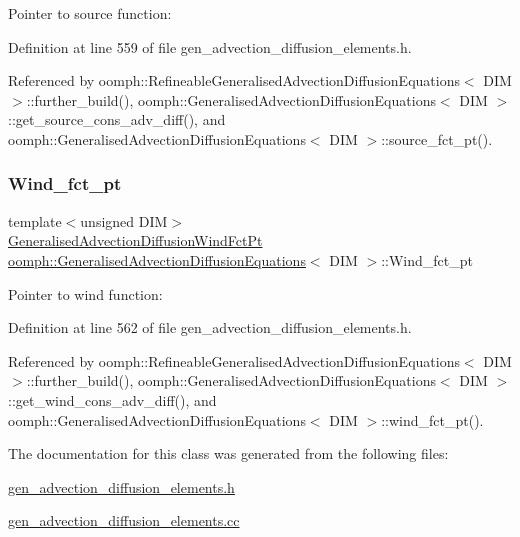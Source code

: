 Pointer to source function\+: 



Definition at line 559 of file gen\+\_\+advection\+\_\+diffusion\+\_\+elements.\+h.



Referenced by oomph\+::\+Refineable\+Generalised\+Advection\+Diffusion\+Equations$<$ D\+I\+M $>$\+::further\+\_\+build(), oomph\+::\+Generalised\+Advection\+Diffusion\+Equations$<$ D\+I\+M $>$\+::get\+\_\+source\+\_\+cons\+\_\+adv\+\_\+diff(), and oomph\+::\+Generalised\+Advection\+Diffusion\+Equations$<$ D\+I\+M $>$\+::source\+\_\+fct\+\_\+pt().

\mbox{\label{classoomph_1_1GeneralisedAdvectionDiffusionEquations_a50dd69aaff906d837a29171c6b1690c9}} 
\subsubsection{\texorpdfstring{Wind\+\_\+fct\+\_\+pt}{Wind\_fct\_pt}}
{\footnotesize\ttfamily template$<$unsigned D\+IM$>$ \\
\hyperlink{classoomph_1_1GeneralisedAdvectionDiffusionEquations_ac5a63eb03aee5957e7b14a4578423cfc}{Generalised\+Advection\+Diffusion\+Wind\+Fct\+Pt} \hyperlink{classoomph_1_1GeneralisedAdvectionDiffusionEquations}{oomph\+::\+Generalised\+Advection\+Diffusion\+Equations}$<$ D\+IM $>$\+::Wind\+\_\+fct\+\_\+pt\hspace{0.3cm}{\ttfamily [protected]}}



Pointer to wind function\+: 



Definition at line 562 of file gen\+\_\+advection\+\_\+diffusion\+\_\+elements.\+h.



Referenced by oomph\+::\+Refineable\+Generalised\+Advection\+Diffusion\+Equations$<$ D\+I\+M $>$\+::further\+\_\+build(), oomph\+::\+Generalised\+Advection\+Diffusion\+Equations$<$ D\+I\+M $>$\+::get\+\_\+wind\+\_\+cons\+\_\+adv\+\_\+diff(), and oomph\+::\+Generalised\+Advection\+Diffusion\+Equations$<$ D\+I\+M $>$\+::wind\+\_\+fct\+\_\+pt().



The documentation for this class was generated from the following files\+:\begin{DoxyCompactItemize}
\item 
\hyperlink{gen__advection__diffusion__elements_8h}{gen\+\_\+advection\+\_\+diffusion\+\_\+elements.\+h}\item 
\hyperlink{gen__advection__diffusion__elements_8cc}{gen\+\_\+advection\+\_\+diffusion\+\_\+elements.\+cc}\end{DoxyCompactItemize}
